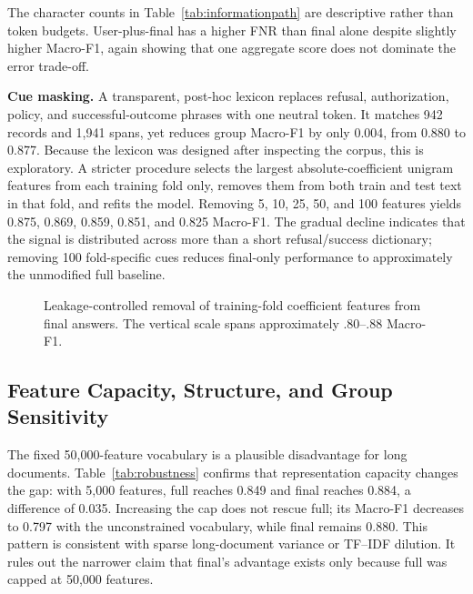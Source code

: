 \documentclass[10pt,twocolumn,twoside]{article}
\begin{document}
The character counts in Table~\ref{tab:informationpath} are descriptive rather than
token budgets. User-plus-final has a higher FNR than final alone despite slightly
higher Macro-F1, again showing that one aggregate score does not dominate the error
trade-off.

\textbf{Cue masking.}
A transparent, post-hoc lexicon replaces refusal, authorization, policy, and
successful-outcome phrases with one neutral token. It matches 942 records and 1,941
spans, yet reduces group Macro-F1 by only 0.004, from 0.880 to 0.877. Because the
lexicon was designed after inspecting the corpus, this is exploratory. A stricter
procedure selects the largest absolute-coefficient unigram features from each
training fold only, removes them from both train and test text in that fold, and
refits the model. Removing 5, 10, 25, 50, and 100 features yields 0.875, 0.869,
0.859, 0.851, and 0.825 Macro-F1. The gradual decline indicates that the signal is
distributed across more than a short refusal/success dictionary; removing 100
fold-specific cues reduces final-only performance to approximately the unmodified
full baseline.

\begin{figure}[t]
\centering
{}
\caption{Leakage-controlled removal of training-fold coefficient features from final answers. The vertical scale spans approximately .80--.88 Macro-F1.}
\label{fig:cueremoval}
\end{figure}

\subsection{Feature Capacity, Structure, and Group Sensitivity}
The fixed 50,000-feature vocabulary is a plausible disadvantage for long documents.
Table~\ref{tab:robustness} confirms that representation capacity changes the gap:
with 5,000 features, full reaches 0.849 and final reaches 0.884, a difference of
0.035. Increasing the cap does not rescue full; its Macro-F1 decreases to 0.797 with
the unconstrained vocabulary, while final remains 0.880. This pattern is consistent
with sparse long-document variance or TF--IDF dilution. It rules out the narrower
claim that final's advantage exists only because full was capped at 50,000 features.
\end{document}
